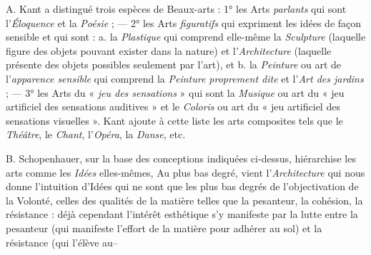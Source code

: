 A. Kant a distingué trois espèces de Beaux-arts : 1° les Arts {\it parlants}
qui sont l’{\it Éloquence} et la {\it Poésie} ; — 2° les Arts {\it figuratifs} qui expriment
les idées de façon sensible et qui sont : a. la {\it Plastique} qui comprend elle-même
la {\it Sculpture} (laquelle figure des objets pouvant exister dans la nature)
et l'{\it Architecture} (laquelle présente des objets possibles seulement par l’art),
et b. la {\it Peinture} ou art de l'{\it apparence sensible} qui comprend la
{\it Peinture proprement dite}
et l'{\it Art des jardins} ; — 3° les Arts du « {\it jeu des sensations} »
qui sont la {\it Musique} ou art du « jeu artificiel des sensations auditives » et
le {\it Coloris} ou art du « jeu artificiel des sensations visuelles ». Kant ajoute à
cette liste les arts composites tels que le {\it Théâtre}, le {\it Chant},
l'{\it Opéra}, la {\it Danse}, etc.

B. Schopenhauer, sur la base des conceptions indiquées ci-dessus,
hiérarchise les arts comme les {\it Idées} elles-mêmes, Au plus bas degré, vient
l'{\it Architecture} qui nous donne l'intuition d’Idées qui ne sont que les plus
bas degrés de l’objectivation de la Volonté, celles des qualités de la matière
telles que la pesanteur, la cohésion, la résistance : déjà cependant l'intérêt
esthétique s’y manifeste par la lutte entre la pesanteur (qui manifeste
l'effort de la matière pour adhérer au sol) et la résistance (qui l'élève au--
